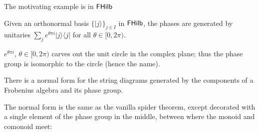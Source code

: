 The motivating example is in $\mathsf{FHilb}$
\begin{example}
Given an orthonormal basis $\{| j \rangle \}_{j \in I}$ in $\mathsf{FHilb}$, the phases are generated by unitaries $\sum_{j} e^{ \theta \pi i}|  j \rangle\langle j|$ for all $\theta \in [0, 2\pi)$. 

 $e^{ \theta \pi i}$, $\theta \in [0, 2\pi)$ carves out the unit circle in the complex plane; thus the phase group is isomorphic to the circle (hence the name).
\end{example}

\begin{lemma}
There is a normal form for the string diagrams generated by the components of a Frobenius algebra and its phase group.
\end{lemma}

The normal form is the same as the vanilla spider theorem, except decorated with a single element of the phase group in the middle, between where the monoid and comonoid meet:

